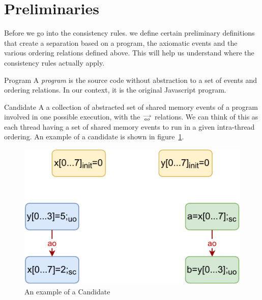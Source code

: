\section{Preliminaries}
    
    Before we go into the consistency rules. we define certain preliminary definitions that create a separation based on a program, the axiomatic events and the various ordering relations defined above. This will help us understand where the consistency rules actually apply.    
    
    \begin{definition}{Program} 
        A \emph{program} is the source code without abstraction to a set of events and ordering relations. In our context, it is the original Javascript program. 
        
    \end{definition}
    
    \begin{definition}{Candidate}
        A a collection of abstracted set of shared memory events of a program involved in one possible execution, with the $\stackrel{\longrightarrow}{_\textit{ao}}$ relations. We can think of this as each thread having a set of shared memory events to run in a given intra-thread ordering. An example of a candidate is shown in figure~\ref{fig:candidate}.
        
        \begin{figure}[H]
            \centering
            \includegraphics[scale=0.7]{ECMAScriptMemoryModel/candidate.pdf}
            \caption{An example of a Candidate}
            \label{fig:candidate}
        \end{figure}
        
    \end{definition}
    
